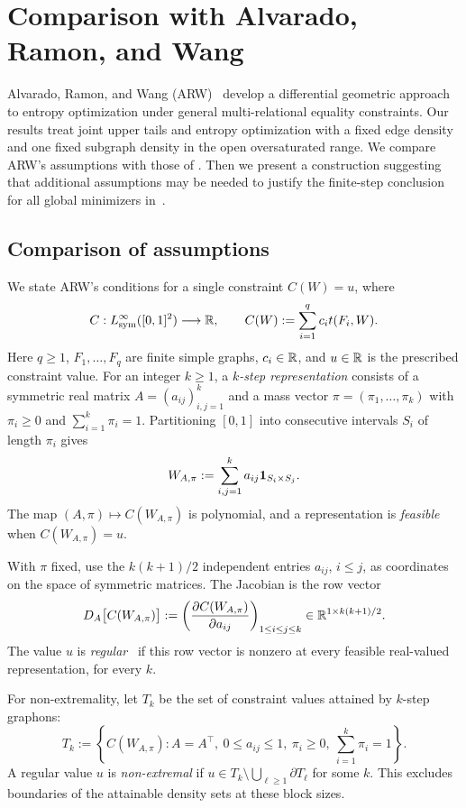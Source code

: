 \section{Comparison with Alvarado, Ramon, and Wang}\label{app:arw}

Alvarado, Ramon, and Wang (ARW)~\cite{AlvaradoRamonWang2026} develop a
differential geometric approach to entropy optimization under general
multi-relational equality constraints. Our results treat joint upper
tails and entropy optimization with a fixed edge density and one fixed
subgraph density in the open oversaturated range. We compare ARW's
assumptions with those of .
Then we present a construction suggesting that additional assumptions may be needed
to justify the finite-step conclusion for all global minimizers
in~\cite[Theorem~5.25]{AlvaradoRamonWang2026}.

\subsection{Comparison of assumptions}\label{app:arw-setting}

We state ARW's conditions for a single constraint $C(W)=u$, where
\[
  C:L^\infty_{\mathrm{sym}}([0,1]^2)\longrightarrow\mathbb R,
  \qquad C(W):=\sum_{i=1}^q c_i t(F_i,W).
\]
Here $q\ge1$, $F_1,\dots,F_q$ are finite simple graphs, $c_i\in\mathbb R$, and
$u\in\mathbb R$ is the prescribed constraint value.
For an integer $k\ge1$, a \emph{$k$-step representation} consists
of a symmetric real matrix $A=(a_{ij})_{i,j=1}^k$ and a mass vector
$\pi=(\pi_1,\dots,\pi_k)$ with $\pi_i\ge0$ and $\sum_{i=1}^k\pi_i=1$.
Partitioning $[0,1]$ into consecutive intervals $S_i$ of length $\pi_i$ gives
\[
  W_{A,\pi}:=\sum_{i,j=1}^k a_{ij}\mathbf 1_{S_i\times S_j}.
\]
The map $(A,\pi)\mapsto C(W_{A,\pi})$ is polynomial, and a representation
is \emph{feasible} when $C(W_{A,\pi})=u$.

With $\pi$ fixed, use the $k(k+1)/2$ independent entries $a_{ij}$, $i\le j$,
as coordinates on the space of symmetric matrices. The Jacobian is the row vector
\[
  D_A\bigl[C(W_{A,\pi})\bigr]:=
  \left(\frac{\partial C(W_{A,\pi})}{\partial a_{ij}}\right)_{1\le i\le j\le k}
  \in\mathbb R^{1\times k(k+1)/2}.
\]
The value $u$ is \emph{regular}~\cite[Definition~5.5]{AlvaradoRamonWang2026}
if this row vector is nonzero at every feasible real-valued representation,
for every $k$.

For non-extremality, let $T_k$ be the set of constraint values attained
by $k$-step graphons:
\[
  T_k:=\left\{C(W_{A,\pi}):
    A=A^\top,\ 0\le a_{ij}\le1,\ \pi_i\ge0,\
    \sum_{i=1}^k\pi_i=1\right\}.
\]
A regular value $u$ is \emph{non-extremal} if
$u\in T_k\setminus\bigcup_{\ell\ge1}\partial T_\ell$ for some $k$.
This excludes boundaries of the attainable density sets at these block
sizes.

